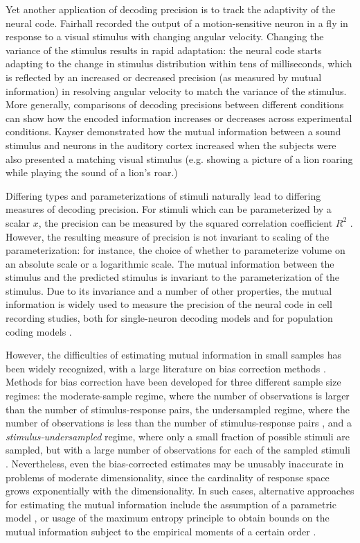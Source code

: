 \documentclass[12pt]{article}
\begin{document}
Yet another application of decoding precision is to track the
adaptivity of the neural code.  Fairhall \cite{Fairhall2001} recorded
the output of a motion-sensitive neuron in a fly in response to a
visual stimulus with changing angular velocity.  Changing the variance
of the stimulus results in rapid adaptation: the neural code starts
adapting to the change in stimulus distribution within tens of
milliseconds, which is reflected by an increased or decreased
precision (as measured by mutual information) in resolving angular
velocity to match the variance of the stimulus.  More generally,
comparisons of decoding precisions between different conditions can
show how the encoded information increases or decreases across
experimental conditions.  Kayser \cite{Kayser2010} demonstrated how
the mutual information between a sound stimulus and neurons in the
auditory cortex increased when the subjects were also presented a
matching visual stimulus (e.g. showing a picture of a lion roaring
while playing the sound of a lion's roar.)

Differing types and parameterizations of stimuli naturally lead to
differing measures of decoding precision.  For stimuli which can be
parameterized by a scalar $x$, the precision can be measured by the
squared correlation coefficient $R^2$ \cite{Abbott1994}.  However, the
resulting measure of precision is not invariant to scaling of the
parameterization: for instance, the choice of whether to parameterize
volume on an absolute scale or a logarithmic scale.  The mutual
information \cite{Shannon1948} between the stimulus and the predicted
stimulus is invariant to the parameterization of the stimulus.  Due to
its invariance and a number of other properties, the mutual
information is widely used to measure the precision of the neural code
in cell recording studies, both for single-neuron decoding
models \cite{Borst1999} and for population coding
models \cite{QuianQuiroga2009}\cite{Ince2010}.

However, the difficulties of estimating mutual information in small
samples has been widely recognized, with a large literature on bias
correction methods \cite{Panzeri2007}\cite{Paninski}.  Methods for
bias correction have been developed for three different sample size
regimes: the moderate-sample regime, where the number of observations
is larger than the number of stimulus-response
pairs\cite{Miller1955}\cite{Strong1998}\cite{Treves1995}, the
undersampled regime, where the number of observations is less than the
number of stimulus-response pairs \cite{Nemenman2004}, and
a \emph{stimulus-undersampled} regime, where only a small fraction of
possible stimuli are sampled, but with a large number of observations
for each of the sampled stimuli \cite{Gastpar2009}.  Nevertheless,
even the bias-corrected estimates may be unusably inaccurate in
problems of moderate dimensionality, since the cardinality of response
space grows exponentially with the dimensionality.  In such cases,
alternative approaches for estimating the mutual information include
the assumption of a parametric model \cite{Brunel1998}\cite{Gastpar2009}\cite{Yarrow2012}, or usage of
the maximum entropy principle to obtain bounds on the mutual
information subject to the empirical moments of a certain
order \cite{Ince2009}\cite{Globerson2009}.
\end{document}
